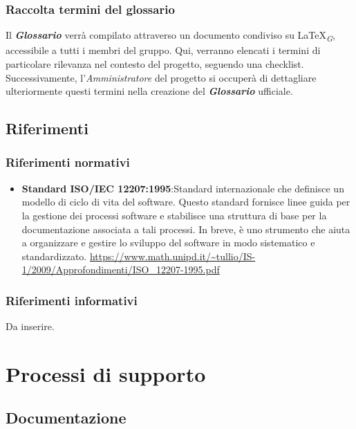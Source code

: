 \documentclass{article}
\begin{document}
\subsubsection{Raccolta termini del glossario}
Il \textbf{\textit{Glossario}} verrà compilato attraverso un documento condiviso su \LaTeX \textsubscript{\textit{G}}, accessibile a tutti i membri del gruppo. Qui, verranno elencati i termini di particolare rilevanza nel contesto del progetto, seguendo una checklist. Successivamente, l'\textit{Amministratore} del progetto si occuperà di dettagliare ulteriormente questi termini nella creazione del \textbf{\textit{Glossario}} ufficiale.

\subsection{Riferimenti}
\subsubsection{Riferimenti normativi}
\begin{itemize}
    \item \textbf{Standard ISO/IEC 12207:1995}:Standard internazionale che definisce un modello di ciclo di vita del software.
     Questo standard fornisce linee guida per la gestione dei processi software e stabilisce una struttura di base per la documentazione associata a tali processi.
     In breve, è uno strumento che aiuta a organizzare e gestire lo sviluppo del software in modo sistematico e standardizzato.
     \href{https://www.math.unipd.it/~tullio/IS-1/2009/Approfondimenti/ISO_12207-1995.pdf}{\url{https://www.math.unipd.it/~tullio/IS-1/2009/Approfondimenti/ISO_12207-1995.pdf}}

    \end{itemize}
\subsubsection{Riferimenti informativi}
Da inserire.

\section{Processi di supporto}

\subsection{Documentazione}
    
\end{document}

